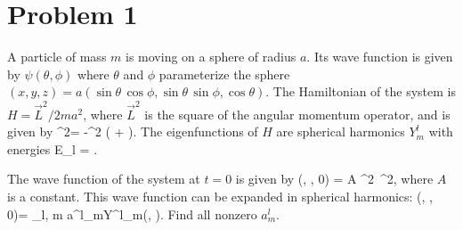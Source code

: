 \newcommand{\tht}{\theta}
\newcommand{\sint}{\sin{\tht}}
\newcommand{\cost}{\cos{\tht}}
\newcommand{\sinwt}{\sin^2{\tht}}
\newcommand{\coswt}{\cos^2{\tht}}
\newcommand{\sinp}{\sin{\phi}}
\newcommand{\cosp}{\cos{\phi}}
\newcommand{\sinwp}{\sin^2{\phi}}
\newcommand{\coswp}{\cos^2{\phi}}

\newcommand{\vL}{\vec{L}}
\newcommand{\vLw}{\vL^2}

\newcommand{\Ylm}{Y^l_m}
\newcommand{\Ylmtp}{\Ylm(\tp)}
\newcommand{\alm}{a^l_m}
\newcommand{\dOmega}{\sint \dd{\tht} \dd{\phi}}

\newcommand{\tp}{\tht, \phi}
\newcommand{\psitpo}{\psi(\tp, 0)}
\newcommand{\psitpt}{\psi(\tp, t)}

\section{Problem 1}
\begin{statement}
	A particle of mass $m$ is moving on a sphere of radius $a$.  Its wave function is given by $\psi(\tp)$ where $\tht$ and $\phi$ parameterize the sphere $(x, y, z) = a(\sint \, \cosp, \sint \, \sinp, \cost)$.  The Hamiltonian of the system is ${H = \vLw / 2 m a^2}$, where $\vLw$ is the square of the angular momentum operator, and is given by
	\beq
		\vLw = -\hbar^2 \left( \frac{1}{\sint} \pdv{}{\tht} \sint \pdv{}{\tht} + \frac{1}{\sinwt} \pdv[2]{}{\phi} \right).
	\eeq
	The eigenfunctions of $H$ are spherical harmonics $\Ylm$ with energies
	\beqn \label{eigene}
		E_l = .
	\eeqn
\end{statement}

\begin{problem} \label{1}
	The wave function of the system at $t = 0$ is given by
	\beq
		\psi(\tp, 0) = A \sinwt \, \coswp,
	\eeq
	where $A$ is a constant.  This wave function can be expanded in spherical harmonics:
	\beq
		\psitpo = \sum_{l, m} \alm \Ylmtp.
	\eeq
	Find all nonzero $\alm$.
\end{problem}

